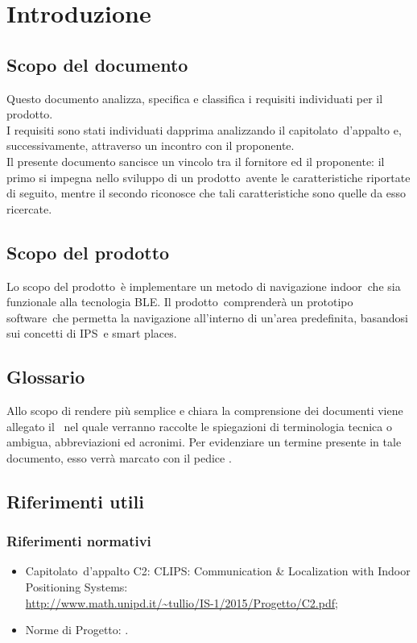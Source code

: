 \documentclass[../AnalisiDeiRequisiti.tex]{subfiles}
\begin{document}
\section{Introduzione}
	\subsection{Scopo del documento}
	Questo documento analizza, specifica e classifica i requisiti individuati per il prodotto\g.\\
	I requisiti sono stati individuati dapprima analizzando il capitolato\g\ d’appalto e, successivamente, attraverso un incontro con il proponente.\\
	Il presente documento sancisce un vincolo tra il fornitore ed il proponente: il primo si impegna nello sviluppo di un prodotto\g\ avente le caratteristiche riportate di seguito, mentre il secondo 				riconosce che tali caratteristiche sono quelle da esso ricercate.

	\subsection{Scopo del prodotto}
	Lo scopo del prodotto\g\ è implementare un metodo di navigazione indoor\g\ che sia funzionale alla tecnologia BLE\g. Il prodotto\g\ 
comprenderà un prototipo software\g\ che permetta la navigazione all’interno di un’area predefinita, basandosi sui concetti di IPS\g\ e smart places\g.
	
	\subsection{Glossario} 
	Allo scopo di rendere più semplice e chiara la comprensione dei documenti viene allegato il \glossariov\ nel quale verranno raccolte le spiegazioni di  terminologia tecnica o  ambigua,
abbreviazioni ed acronimi. Per evidenziare un termine presente in tale documento, esso verrà marcato con il pedice \g.
	
	\subsection{Riferimenti utili}
		\subsubsection{Riferimenti normativi}
		\begin{itemize}
			\item Capitolato\g\ d’appalto C2: CLIPS\g: Communication \& Localization with Indoor Positioning Systems: \\\url{http://www.math.unipd.it/~tullio/IS-1/2015/Progetto/C2.pdf};
			\item Norme di Progetto: \normediprogettov.
		\end{itemize}
\end{document}
